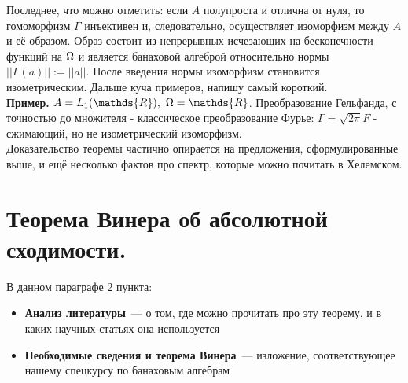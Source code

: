 \documentclass[12pt]{extarticle}
\theoremstyle{definition}
\begin{document}
      Последнее, что можно отметить: если $A$ полупроста и отлична от нуля, то гомоморфизм $\Gamma$ инъективен и, следовательно, осуществляет изоморфизм между $A$ и её образом. Образ состоит из непрерывных исчезающих на бесконечности функций на $\ohm$ и является банаховой алгеброй относительно нормы $||\Gamma(a)|| := ||a||$. После введения нормы изоморфизм становится изометрическим. Дальше куча примеров, напишу самый короткий. \\
      
      \textbf{Пример.} $A = L_1(\mathds{R}),\ \ohm = \mathds{R}$. Преобразование Гельфанда, с точностью до множителя - классическое преобразование Фурье: $\Gamma = \sqrt{2\pi} F$ - сжимающий, но не изометрический изоморфизм.\\
      
      Доказательство теоремы частично опирается на предложения, сформулированные выше, и ещё несколько фактов про спектр, которые можно почитать в Хелемском.
      
      

    \section[Теорема Винера.]{Теорема Винера об абсолютной сходимости.}
    В данном параграфе 2 пункта:
	\begin{itemize}
		\item \textbf{Анализ литературы}~--- о том, где можно прочитать про эту теорему, и в каких научных статьях она используется
		\item \textbf{Необходимые сведения и теорема Винера}~--- изложение, соответствующее нашему спецкурсу по банаховым алгебрам
	\end{itemize}
\end{document}
